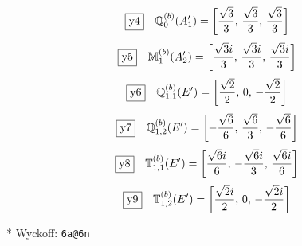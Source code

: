 \documentclass[fleqn,10pt,landscape]{jsarticle}
\begin{document}
\begin{dmath*}
\fbox{y4}\quad \mathbb{Q}_{0}^{(b)}(A_{1}^{\prime})=\left[ \frac{\sqrt{3}}{3},\, \frac{\sqrt{3}}{3},\, \frac{\sqrt{3}}{3} \right]
\end{dmath*}
\begin{dmath*}
\fbox{y5}\quad \mathbb{M}_{1}^{(b)}(A_{2}^{\prime})=\left[ \frac{\sqrt{3} i}{3},\, \frac{\sqrt{3} i}{3},\, \frac{\sqrt{3} i}{3} \right]
\end{dmath*}
\begin{dmath*}
\fbox{y6}\quad \mathbb{Q}_{1,1}^{(b)}(E^{\prime})=\left[ \frac{\sqrt{2}}{2},\, 0,\, - \frac{\sqrt{2}}{2} \right]
\end{dmath*}
\begin{dmath*}
\fbox{y7}\quad \mathbb{Q}_{1,2}^{(b)}(E^{\prime})=\left[ - \frac{\sqrt{6}}{6},\, \frac{\sqrt{6}}{3},\, - \frac{\sqrt{6}}{6} \right]
\end{dmath*}
\begin{dmath*}
\fbox{y8}\quad \mathbb{T}_{1,1}^{(b)}(E^{\prime})=\left[ \frac{\sqrt{6} i}{6},\, - \frac{\sqrt{6} i}{3},\, \frac{\sqrt{6} i}{6} \right]
\end{dmath*}
\begin{dmath*}
\fbox{y9}\quad \mathbb{T}_{1,2}^{(b)}(E^{\prime})=\left[ \frac{\sqrt{2} i}{2},\, 0,\, - \frac{\sqrt{2} i}{2} \right]
\end{dmath*}
\vspace{5mm}

\noindent ** Wyckoff: \texttt{6a@6n}
\end{document}
